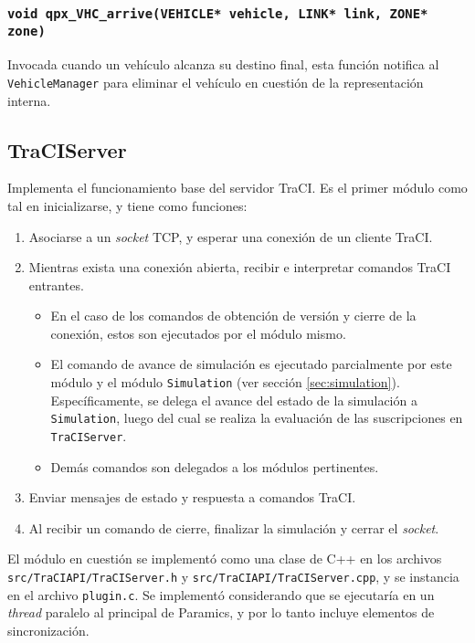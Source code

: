 \subsubsection{\texttt{void qpx\_VHC\_arrive(VEHICLE* vehicle, LINK* link, ZONE* zone)}}

Invocada cuando un vehículo alcanza su destino final, esta función notifica al \texttt{VehicleManager} para eliminar el vehículo en cuestión de la representación interna.

\subsection{TraCIServer}\label{sec:traciserver}

Implementa el funcionamiento base del servidor TraCI. Es el primer módulo como tal en inicializarse, y tiene como funciones:

\begin{enumerate}
    \item Asociarse a un \emph{socket} TCP, y esperar una conexión de un cliente TraCI.
    \item Mientras exista una conexión abierta, recibir e interpretar comandos TraCI entrantes.
    \begin{itemize}
        \item En el caso de los comandos de obtención de versión y cierre de la conexión, estos son ejecutados por el módulo mismo.
        \item El comando de avance de simulación es ejecutado parcialmente por este módulo y el módulo \texttt{Simulation} (ver sección \ref{sec:simulation}). Específicamente, se delega el avance del estado de la simulación a \texttt{Simulation}, luego del cual se realiza la evaluación de las suscripciones en \texttt{TraCIServer}.
        \item Demás comandos son delegados a los módulos pertinentes.
    \end{itemize}
    \item Enviar mensajes de estado y respuesta a comandos TraCI.
    \item Al recibir un comando de cierre, finalizar la simulación y cerrar el \emph{socket}.
\end{enumerate}

El módulo en cuestión se implementó como una clase de C++ en los archivos \texttt{src/TraCIAPI/TraCIServer.h} y \texttt{src/TraCIAPI/TraCIServer.cpp}, y se instancia en el archivo \texttt{plugin.c}. Se implementó considerando que se ejecutaría en un \emph{thread} paralelo al principal de Paramics, y por lo tanto incluye elementos de sincronización.

